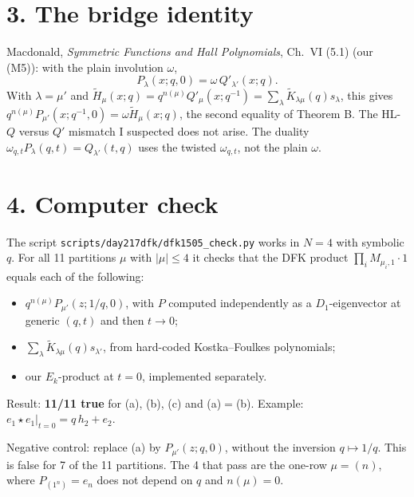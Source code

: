 \documentclass[10pt]{article}
\newcommand{\Ht}{\widetilde{H}}
\newcommand{\Kt}{\widetilde{K}}
\newcommand{\file}[1]{\nolinkurl{#1}}
\begin{document}
\section*{3. The bridge identity}
Macdonald, \emph{Symmetric Functions and Hall Polynomials}, Ch.~VI (5.1) (our (M5)): with the plain involution $\omega$,
\[
P_\lambda(x;q,0)=\omega\,Q'_{\lambda'}(x;q).
\]
With $\lambda=\mu'$ and $\Ht_\mu(x;q)=q^{n(\mu)}Q'_\mu(x;q^{-1})=\sum_\lambda\Kt_{\lambda\mu}(q)s_\lambda$, this gives $q^{n(\mu)}P_{\mu'}(x;q^{-1},0)=\omega\Ht_\mu(x;q)$, the second equality of Theorem B. The HL-$Q$ versus $Q'$ mismatch I suspected does not arise. The duality $\omega_{q,t}P_\lambda(q,t)=Q_{\lambda'}(t,q)$ uses the twisted $\omega_{q,t}$, not the plain $\omega$.

\section*{4. Computer check}
The script \file{scripts/day217dfk/dfk1505_check.py} works in $N=4$ with symbolic $q$. For all 11 partitions $\mu$ with $|\mu|\le4$ it checks that the DFK product $\prod_iM_{\mu_i,1}\cdot1$ equals each of the following:
\begin{itemize}
\item[(a)] $q^{n(\mu)}P_{\mu'}(z;1/q,0)$, with $P$ computed independently as a $D_1$-eigenvector at generic $(q,t)$ and then $t\to0$;
\item[(b)] $\sum_\lambda\Kt_{\lambda\mu}(q)s_{\lambda'}$, from hard-coded Kostka--Foulkes polynomials;
\item[(c)] our $E_k$-product at $t=0$, implemented separately.
\end{itemize}
Result: \textbf{11/11 true} for (a), (b), (c) and (a)$=$(b). Example: $e_1\star e_1|_{t=0}=q\,h_2+e_2$.

Negative control: replace (a) by $P_{\mu'}(z;q,0)$, without the inversion $q\mapsto1/q$. This is false for 7 of the 11 partitions. The 4 that pass are the one-row $\mu=(n)$, where $P_{(1^n)}=e_n$ does not depend on $q$ and $n(\mu)=0$.
\end{document}
